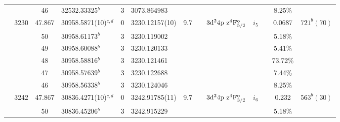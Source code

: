 \begin{table*}
\begin{center}
{\begin{tabular}{:l;l;c;l;c;l;c;l;l;c;c;c;c}
\rowstyle{\itshape}               &        & 46        & 32532.33325$^{b}$                & 3 &   3073.864983      &      & $                                        $ & $                                        $ & $      $ &              & 8.25\%    & $     ^{}     $\\
                                  & 3230   & 47.867    & 30958.5871(10)$^{c,d}$           & 0 &    3230.12157(10)  &  9.7 & $                                        $ & $3\rm{d}^24\rm{p~z}^4\rm{F}_{5/2}^{\rm o}$ & $i_{5} $ &              & 0.0687    & $  721^{b}(70) $\\
\rowstyle{\itshape}               &        & 50        & 30958.61173$^{b}$                & 3 &   3230.119002      &      & $                                        $ & $                                        $ & $      $ &              & 5.18\%    & $     ^{}     $\\
\rowstyle{\itshape}               &        & 49        & 30958.60088$^{b}$                & 3 &   3230.120133      &      & $                                        $ & $                                        $ & $      $ &              & 5.41\%    & $     ^{}     $\\
\rowstyle{\itshape}               &        & 48        & 30958.58816$^{b}$                & 3 &   3230.121461      &      & $                                        $ & $                                        $ & $      $ &              & 73.72\%   & $     ^{}     $\\
\rowstyle{\itshape}               &        & 47        & 30958.57639$^{b}$                & 3 &   3230.122688      &      & $                                        $ & $                                        $ & $      $ &              & 7.44\%    & $     ^{}     $\\
\rowstyle{\itshape}               &        & 46        & 30958.56338$^{b}$                & 3 &   3230.124046      &      & $                                        $ & $                                        $ & $      $ &              & 8.25\%    & $     ^{}     $\\
                                  & 3242   & 47.867    & 30836.4271(10)$^{c,d}$           & 0 &    3242.91785(11)  &  9.7 & $                                        $ & $3\rm{d}^24\rm{p~z}^4\rm{F}_{3/2}^{\rm o}$ & $i_{6} $ &              & 0.232     & $  563^{b}(30) $\\
\rowstyle{\itshape}               &        & 50        & 30836.45206$^{b}$                & 3 &   3242.915229      &      & $                                        $ & $                                        $ & $      $ &              & 5.18\%    & $     ^{}     $\\

\end{tabular}}
\end{center}
\end{table*}
